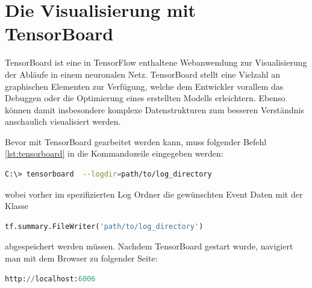 \section{Die Visualisierung mit TensorBoard}

TensorBoard ist eine in TensorFlow enthaltene Webanwendung zur Visualisierung der Abläufe in einem neuronalen Netz. TensorBoard stellt eine Vielzahl an graphischen Elementen zur Verfügung, welche dem Entwickler vorallem das Debuggen oder die Optimierung eines erstellten Modells erleichtern. Ebenso können damit insbesondere komplexe Datenstrukturen zum besseren Verständnis anschaulich visualisiert werden. 

Bevor mit TensorBoard gearbeitet werden kann, muss folgender Befehl \ref{lst:tensorboard} in die Kommandozeile eingegeben werden:
\\

\begin{minipage}{\linewidth}
\begin{lstlisting}[language=bash, label={lst:tensorboard}]
C:\> tensorboard  --logdir=path/to/log_directory

\end{lstlisting}
\end{minipage}

\vspace{0.2cm}
wobei vorher im spezifizierten Log Ordner die gewünschten Event Daten mit der Klasse
\\

\begin{minipage}{\linewidth}
\begin{lstlisting}[language=Python, label={lst:FileWriter}]
tf.summary.FileWriter('path/to/log_directory')

\end{lstlisting}
\end{minipage}
\vspace{0.2cm}

abgespeichert werden müssen. Nachdem TensorBoard gestart wurde, navigiert man mit dem Browser zu folgender Seite:
\\

\begin{minipage}{\linewidth}
\begin{lstlisting}[language=Python, label={lst:FileWriter}]
http://localhost:6006

\end{lstlisting}
\end{minipage}
\vspace{0.2cm}

